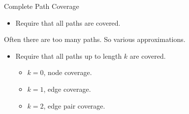 \documentclass{beamer}
\begin{document}
\begin{frame}{Complete Path Coverage}
  \begin{itemize}
  \item Require that all paths are covered.
  \end{itemize}
  Often there are too many paths. So various approximations.
  \begin{itemize}
  \item Require that all paths up to length $k$ are covered.
    \begin{itemize}
    \item $k=0$, node coverage.
    \item $k=1$, edge coverage.
    \item $k=2$, edge pair coverage.
    \end{itemize}
  \end{itemize}
\end{frame}
\end{document}
